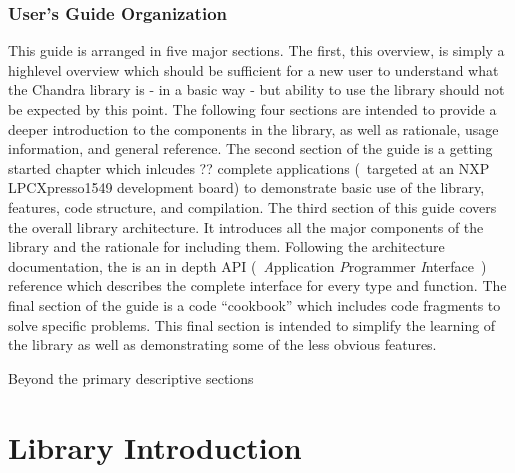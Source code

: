 \documentclass[12pt,letterpaper,article]{memoir} %
\begin{document}
\section{User's Guide Organization}
This guide is arranged in five major sections.  The first, this overview, is simply a highlevel overview which should be sufficient for a new user to understand what the Chandra library is - in a basic way - but ability to use the library should not be expected by this point.  The following four sections are intended to provide a deeper introduction to the components in the library, as well as rationale, usage information, and general reference.  The second section of the guide is a getting started chapter which inlcudes ?? complete applications (~targeted at an NXP LPCXpresso1549 development board) to demonstrate basic use of the library, features, code structure, and compilation.  The third section of this guide covers the overall library architecture.  It introduces all the major components of the library and the rationale for including them.  Following the architecture documentation, the is an in depth API (~\emph{A}pplication \emph{P}rogrammer \emph{I}nterface~) reference which describes the complete interface for every type and function.  The final section of the guide is a code ``cookbook'' which includes code fragments to solve specific problems.  This final section is intended to simplify the learning of the library as well as demonstrating some of the less obvious features.

Beyond the primary descriptive sections

\part{Library Introduction}
\end{document}
